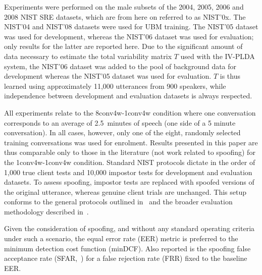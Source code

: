 
Experiments were performed on the male subsets of the 2004, 2005, 2006 and 2008 NIST SRE datasets, which are from here on referred to as NIST'0x.  
The NIST'04 and NIST'08 datasets were used for UBM training.
The NIST'05 dataset was used for development, whereas the NIST'06 dataset was used for evaluation;  
only results for the latter are reported here.
Due to the significant amount of data necessary to estimate the total variability matrix $T$ used with the IV-PLDA system, the NIST'06 dataset was added to the pool of background data for development whereas the NIST'05 dataset was used for evaluation. 
$T$ is thus learned using approximately 11,000 utterances from 900 speakers, while independence between development and evaluation datasets is always respected.
 
All experiments relate to the 8conv4w-1conv4w condition where one conversation corresponds to an average of 2.5~minutes of speech (one side of a 5 minute conversation).  
In all cases, however, only one of the eight, randomly selected training conversations was used for enrolment.
Results presented in this paper are thus comparable only to those in the literature (not work related to spoofing) for the 1conv4w-1conv4w condition. 
Standard NIST protocols dictate in the order of 1,000 true client tests and 10,000 impostor tests for development and evaluation datasets. 
To assess spoofing, impostor tests are replaced with spoofed versions of the original utterance, whereas genuine client trials are unchanged.
This setup conforms to the general protocols outlined in~\cite{Wu2014a} and the broader evaluation methodology described in~\cite{HadidSPM2015}.

Given the consideration of spoofing, and without any standard operating criteria under such a scenario, the equal error rate (EER) metric is preferred to the minimum detection cost function (minDCF).  Also reported is the spoofing false acceptance rate (SFAR,~\cite{Johnson2010}) for a false rejection rate (FRR) fixed to the baseline EER.
